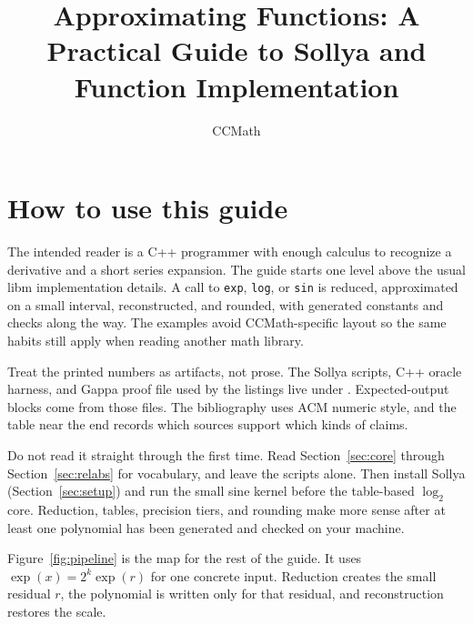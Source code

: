 \documentclass[manuscript, nonacm]{acmart}
\title{Approximating Functions: A Practical Guide to Sollya and Function Implementation}
\author{CCMath}
\date{}
\begin{document}
  \maketitle



  \section{How to use this guide}

  The intended reader is a C++ programmer with enough calculus to recognize a
  derivative and a short series expansion. The guide starts one level above the
  usual libm implementation details. A call to \texttt{exp}, \texttt{log}, or
  \texttt{sin} is reduced, approximated on a small interval, reconstructed, and
  rounded, with generated constants and checks along the way. The examples avoid
  CCMath-specific layout so the same habits still apply when reading another math
  library.

  Treat the printed numbers as artifacts, not prose. The Sollya scripts, C++
  oracle harness, and Gappa proof file used by the listings live under
  . Expected-output blocks come from those
  files. The bibliography uses ACM numeric style, and the table near the end
  records which sources support which kinds of claims.

  Do not read it straight through the first time. Read
  Section~\ref{sec:core} through Section~\ref{sec:relabs} for vocabulary, and
  leave the scripts alone. Then install Sollya (Section~\ref{sec:setup}) and run
  the small sine kernel before the table-based $\log_2$ core. Reduction, tables,
  precision tiers, and rounding make more sense after at least one polynomial has
  been generated and checked on your machine.

  Figure~\ref{fig:pipeline} is the map for the rest of the guide. It uses
  $\exp(x) = 2^k \exp(r)$ for one concrete input. Reduction creates the small
  residual $r$, the polynomial is written only for that residual, and
  reconstruction restores the scale.
\end{document}
